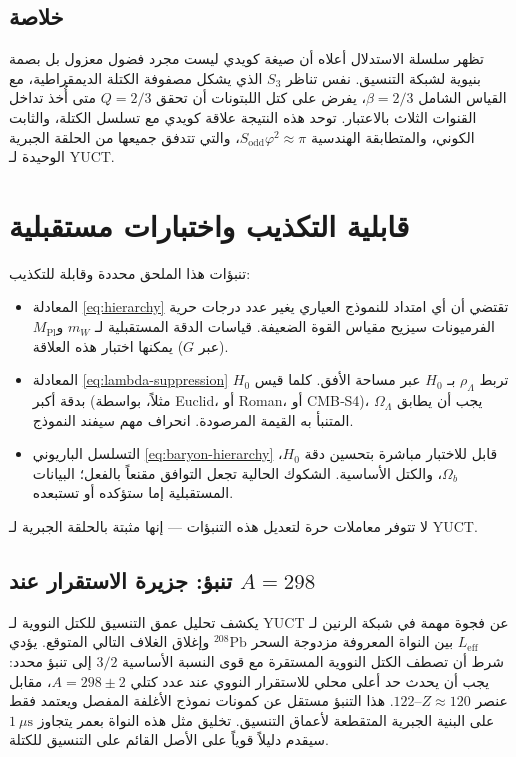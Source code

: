 \documentclass[12pt,a4paper]{article}
\begin{document}
	\subsection{خلاصة}
	
	تظهر سلسلة الاستدلال أعلاه أن صيغة كويدي ليست مجرد فضول معزول بل بصمة بنيوية لشبكة التنسيق. نفس تناظر \(S_3\) الذي يشكل مصفوفة الكتلة الديمقراطية، مع القياس الشامل \(\beta=2/3\)، يفرض على كتل اللبتونات أن تحقق \(Q=2/3\) متى أُخذ تداخل القنوات الثلاث بالاعتبار. توحد هذه النتيجة علاقة كويدي مع تسلسل الكتلة، والثابت الكوني، والمتطابقة الهندسية \(S_{\mathrm{odd}}\varphi^2 \approx \pi\)، والتي تتدفق جميعها من الحلقة الجبرية الوحيدة لـ YUCT.
	
	
	\section{قابلية التكذيب واختبارات مستقبلية}
	
	تنبؤات هذا الملحق محددة وقابلة للتكذيب:
	\begin{itemize}
		\item المعادلة \eqref{eq:hierarchy} تقتضي أن أي امتداد للنموذج العياري يغير عدد درجات حرية الفرميونات سيزيح مقياس القوة الضعيفة. قياسات الدقة المستقبلية لـ \(m_W\) و\(M_{\mathrm{Pl}}\) (عبر \(G\)) يمكنها اختبار هذه العلاقة.
		\item المعادلة \eqref{eq:lambda-suppression} تربط \(\rho_\Lambda\) بـ \(H_0\) عبر مساحة الأفق. كلما قيس \(H_0\) بدقة أكبر (مثلاً، بواسطة Euclid، أو Roman، أو CMB‑S4)، يجب أن يطابق \(\Omega_\Lambda\) المتنبأ به القيمة المرصودة. انحراف مهم سيفند النموذج.
		\item التسلسل الباريوني \eqref{eq:baryon-hierarchy} قابل للاختبار مباشرة بتحسين دقة \(H_0\)، \(\Omega_b\)، والكتل الأساسية. الشكوك الحالية تجعل التوافق مقنعاً بالفعل؛ البيانات المستقبلية إما ستؤكده أو تستبعده.
	\end{itemize}
	لا تتوفر معاملات حرة لتعديل هذه التنبؤات — إنها مثبتة بالحلقة الجبرية لـ YUCT.
	
	\subsection{تنبؤ: جزيرة الاستقرار عند \(A=298\)}
	
	يكشف تحليل عمق التنسيق للكتل النووية لـ YUCT عن فجوة مهمة في شبكة الرنين لـ \(L_{\mathrm{eff}}\) بين النواة المعروفة مزدوجة السحر \(^{208}\mathrm{Pb}\) وإغلاق الغلاف التالي المتوقع. يؤدي شرط أن تصطف الكتل النووية المستقرة مع قوى النسبة الأساسية \(3/2\) إلى تنبؤ محدد: يجب أن يحدث حد أعلى محلي للاستقرار النووي عند عدد كتلي \(A = 298 \pm 2\)، مقابل عنصر \(Z \approx 120\)--\(122\). هذا التنبؤ مستقل عن كمونات نموذج الأغلفة المفصل ويعتمد فقط على البنية الجبرية المتقطعة لأعماق التنسيق. تخليق مثل هذه النواة بعمر يتجاوز \(1\ \mu\text{s}\) سيقدم دليلاً قوياً على الأصل القائم على التنسيق للكتلة.
	
\end{document}
